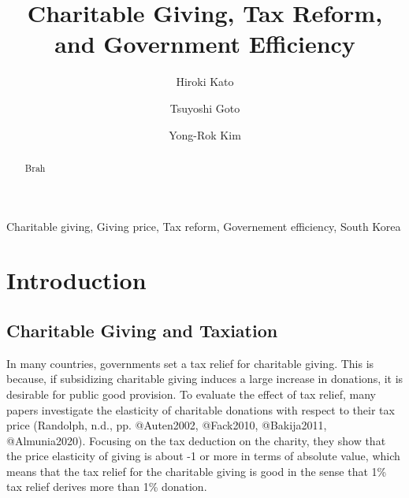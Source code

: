 \documentclass[ review  , 3p ]{elsarticle}
\begin{document}
  \begin{frontmatter}

    \title{Charitable Giving, Tax Reform, and Government Efficiency}
                \author[Osaka University]{
      Hiroki Kato 
       \corref{*} }
        \author[Chiba University]{
      Tsuyoshi Goto 
      }
        \author[Kobe University]{
      Yong-Rok Kim 
      }
            \address[Osaka University]{Graduate School of Economics, Osaka University, Japan}
        \address[Chiba University]{Graduate School of Economics, Chiba University, Japan}
        \address[Kobe University]{Graduate School of Economics, Kobe University, Japan}
      
        \begin{abstract}
      Brah
    \end{abstract}
      
        \begin{keyword}
      Charitable giving, Giving price, Tax reform, Governement efficiency, South Korea
    \end{keyword}
    
  \end{frontmatter}

  \hypertarget{introduction}{%
  \section{Introduction}\label{introduction}}
  
  \hypertarget{charitable-giving-and-taxiation}{%
  \subsection{Charitable Giving and Taxiation}\label{charitable-giving-and-taxiation}}
  
  In many countries, governments set a tax relief for charitable giving. This is because, if subsidizing charitable giving induces a large increase in donations, it is desirable for public good provision. To evaluate the effect of tax relief, many papers investigate the elasticity of charitable donations with respect to their tax price (Randolph, n.d., pp. @Auten2002, @Fack2010, @Bakija2011, @Almunia2020). Focusing on the tax deduction on the charity, they show that the price elasticity of giving is about -1 or more in terms of absolute value, which means that the tax relief for the charitable giving is good in the sense that 1\% tax relief derives more than 1\% donation.
  
\end{document}
